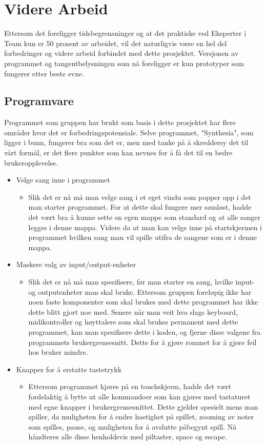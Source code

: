 \chapter{Videre Arbeid}
Ettersom det foreligger tidsbegrensninger og at det praktiske ved Eksperter i Team kun er 50 prosent av arbeidet, vil det naturligvis være en hel del forbedringer og videre arbeid forbindet med dette prosjektet. Versjonen av programmet og tangentbelysningen som nå foreligger er kun prototyper som fungerer etter beste evne. 

\section{Programvare}
Programmet som gruppen har brukt som basis i dette prosjektet har flere områder hvor det er forbedringspotensiale. Selve programmet, "Synthesia", som ligger i bunn, fungerer bra som det er, men med tanke på å skreddersy det til vårt formål, er det flere punkter som kan nevnes for å få det til en bedre brukeropplevelse.
\begin{itemize}

\item{Velge sang inne i programmet}
\begin{itemize}
\item{Slik det er nå må man velge sang i et eget vindu som popper opp i det man starter programmet. For at dette skal fungere mer sømløst, hadde det vært bra å kunne sette en egen mappe som standard og at alle sanger legges i denne mappa. Videre da at man kan velge inne på startskjermen i programmet hvilken sang man vil spille utifra de sangene som er i denne mappa.}
\end{itemize}

\item{Maskere valg av input/output-enheter}
\begin{itemize}
\item{Slik det er nå må man spesifisere, før man starter en sang, hvilke input- og outputenheter man skal bruke. Ettersom gruppen foreløpig ikke har noen faste komponenter som skal brukes med dette programmet har ikke dette blitt gjort noe med. Senere når man veit hva slags keyboard, midikontroller og høyttalere som skal brukes permanent med dette programmet, kan man spesifisere dette i koden, og fjerne disse valgene fra programmets brukergrensesnitt. Dette for å gjøre rommet for å gjøre feil hos bruker mindre.}
\end{itemize}

\item{Knapper for å erstatte tastetrykk}
\begin{itemize}
\item{Ettersom programmet kjøres på en touchskjerm, hadde det vært fordelaktig å bytte ut alle kommandoer som kan gjøres med tastaturet med egne knapper i brukergrensesnittet. Dette gjelder spesielt mens man spiller, da muligheten for å endre hastighet på spillet, zooming av noter som spilles, pause, og muligheten for å avslutte påbegynt spill. Nå håndteres alle disse henholdsvis med piltaster, space og escape.}
\end{itemize}

\end{itemize}

